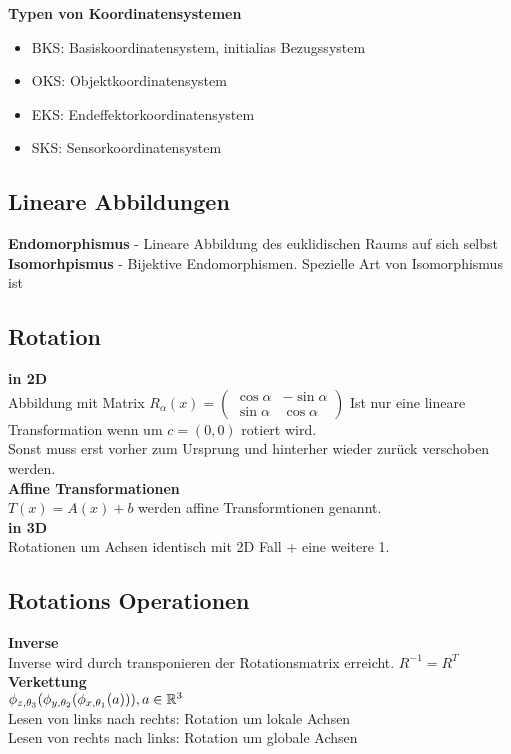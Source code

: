\textbf{Typen von Koordinatensystemen}\\
\begin{itemize}
  \item BKS: Basiskoordinatensystem, initialias Bezugssystem
  \item OKS: Objektkoordinatensystem
  \item EKS: Endeffektorkoordinatensystem
  \item SKS: Sensorkoordinatensystem
\end{itemize}

\subsection{Lineare Abbildungen}
\textbf{Endomorphismus} - Lineare Abbildung des euklidischen Raums auf sich selbst\\
\textbf{Isomorhpismus} - Bijektive Endomorphismen. Spezielle Art von Isomorphismus ist \SO

\subsection{Rotation}
\textbf{in 2D}\\
Abbildung mit Matrix \(R_\alpha(x) = \begin{pmatrix} \cos \alpha & -\sin\alpha \\ \sin \alpha & \cos \alpha\end{pmatrix}\)
Ist nur eine lineare Transformation wenn um \(c=(0,0)\) rotiert wird.\\
Sonst muss erst vorher zum Ursprung und hinterher wieder zurück verschoben werden.\\
\textbf{Affine Transformationen}\\
\(T(x) = A(x) + b\) werden affine Transformtionen genannt.\\

\textbf{in 3D}\\
Rotationen um Achsen identisch mit 2D Fall + eine weitere 1.

\subsection{Rotations Operationen}
\textbf{Inverse}\\
Inverse wird durch transponieren der Rotationsmatrix erreicht. \(R^{-1} = R^T\)\\
\textbf{Verkettung}\\
\(\phi_{z, \theta_3}(\phi_{y, \theta_2}(\phi_{x, \theta_1}(a))), a \in \mathbb{R}^3\)\\
Lesen von links nach rechts: Rotation um lokale Achsen\\
Lesen von rechts nach links: Rotation um globale Achsen\\

